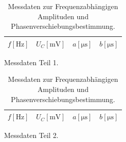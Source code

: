 \begin{table}
  \hspace*{\fill}
  \begin{subfigure}{0.40\textwidth}
  \centering
  \caption{Messdaten Teil 1.}
  \label{tab:2a}
  \begin{tabular}{c c c c}
    \toprule
     {$f [\si{\hertz}]$} & {$U_C [\si{\milli\volt}]$} & {$a [\si{\micro\second}]$} & {$b [\si{\micro\second}]$}\\
    \midrule
    
    \bottomrule
  \end{tabular}
\end{subfigure}
\hspace*{\fill}
\begin{subfigure}{0.40\textwidth}
  \centering
  \caption{Messdaten Teil 2.}
  \label{tab:2b}
  \begin{tabular}{c c c c}
    \toprule
    {$f [\si{\hertz}]$} & {$U_C [\si{\milli\volt}]$} & {$a [\si{\micro\second}]$} & {$b [\si{\micro\second}]$}\\
    \midrule
    
    \bottomrule
  \end{tabular}
\end{subfigure}
\\
\hspace*{\fill}
\hspace*{\fill}
\caption{Messdaten zur Frequenzabhängigen Amplituden und Phasenverschiebungsbestimmung.}
\label{tab:2}
\end{table}
%    


